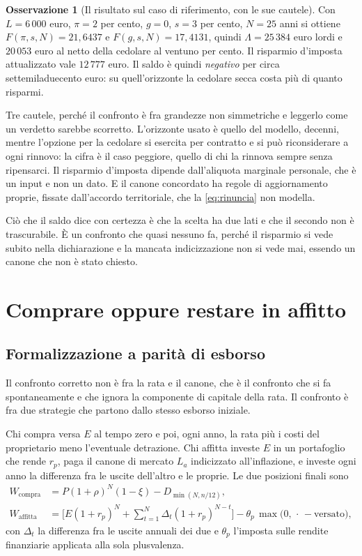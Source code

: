 \documentclass[11pt,a4paper]{article}
\theoremstyle{definition}
\newtheorem{osservazione}[definizione]{Osservazione}
\theoremstyle{plain}
\begin{document}
\begin{osservazione}[Il risultato sul caso di riferimento, con le sue cautele]
Con $L=6\,000$ euro, $\pi=2$ per cento, $g=0$, $s=3$ per cento, $N=25$ anni si ottiene $F(\pi,s,N)=21{,}6437$ e $F(g,s,N)=17{,}4131$, quindi $\Lambda = 25\,384$ euro lordi e $20\,053$ euro al netto della cedolare al ventuno per cento. Il risparmio d'imposta attualizzato vale $12\,777$ euro. Il saldo è quindi \emph{negativo} per circa settemiladuecento euro: su quell'orizzonte la cedolare secca costa più di quanto risparmi.

Tre cautele, perché il confronto è fra grandezze non simmetriche e leggerlo come un verdetto sarebbe scorretto. L'orizzonte usato è quello del modello, decenni, mentre l'opzione per la cedolare si esercita per contratto e si può riconsiderare a ogni rinnovo: la cifra è il caso peggiore, quello di chi la rinnova sempre senza ripensarci. Il risparmio d'imposta dipende dall'aliquota marginale personale, che è un input e non un dato. E il canone concordato ha regole di aggiornamento proprie, fissate dall'accordo territoriale, che la \eqref{eq:rinuncia} non modella.

Ciò che il saldo dice con certezza è che la scelta ha due lati e che il secondo non è trascurabile. È un confronto che quasi nessuno fa, perché il risparmio si vede subito nella dichiarazione e la mancata indicizzazione non si vede mai, essendo un canone che non è stato chiesto.
\end{osservazione}

\section{Comprare oppure restare in affitto}

\subsection{Formalizzazione a parità di esborso}

Il confronto corretto non è fra la rata e il canone, che è il confronto che si fa spontaneamente e che ignora la componente di capitale della rata. Il confronto è fra due strategie che partono dallo stesso esborso iniziale.

Chi compra versa $E$ al tempo zero e poi, ogni anno, la rata più i costi del proprietario meno l'eventuale detrazione. Chi affitta investe $E$ in un portafoglio che rende $r_p$, paga il canone di mercato $L_a$ indicizzato all'inflazione, e investe ogni anno la differenza fra le uscite dell'altro e le proprie. Le due posizioni finali sono
\begin{align}
W_{\text{compra}} &= P(1+\rho)^N(1-\xi) - D_{\min(N,n/12)},
\label{eq:w-compra}\\
W_{\text{affitta}} &= \Big[E(1+r_p)^N + \sum_{t=1}^{N}\Delta_t (1+r_p)^{N-t}\Big] - \theta_p\,\max\big(0,\,\cdot\, - \text{versato}\big),
\label{eq:w-affitta}
\end{align}
con $\Delta_t$ la differenza fra le uscite annuali dei due e $\theta_p$ l'imposta sulle rendite finanziarie applicata alla sola plusvalenza.
\end{document}
